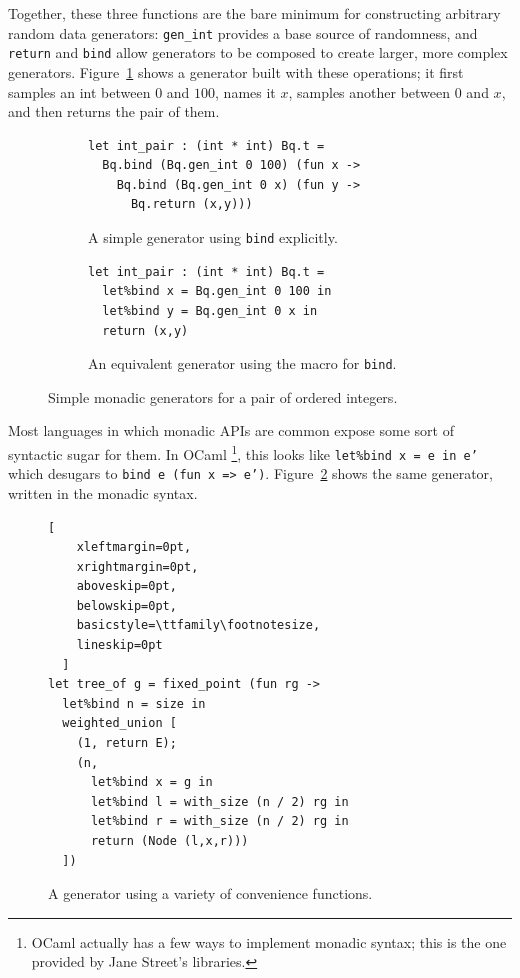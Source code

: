 \documentclass[acmsmall]{acmart}
\theoremstyle{definition}
\begin{document}
Together, these three functions are the bare minimum for constructing arbitrary
random data generators: \texttt{gen\_int} provides a base source of randomness,
and \texttt{return} and \texttt{bind} allow generators to be composed to create
larger, more complex generators. Figure~\ref{fig:simple-bind} shows a generator
built with these operations; it first samples an int between $0$ and $100$,
names it $x$, samples another between $0$ and $x$, and then returns the pair of
them.

\begin{figure}[h]
  \begin{subfigure}{.49\textwidth}
\begin{lstlisting}
let int_pair : (int * int) Bq.t =
  Bq.bind (Bq.gen_int 0 100) (fun x ->
    Bq.bind (Bq.gen_int 0 x) (fun y ->
      Bq.return (x,y)))
\end{lstlisting}
\caption{A simple generator using \texttt{bind} explicitly.}\label{fig:simple-bind}
  \end{subfigure}
  \begin{subfigure}{.49\textwidth}
\begin{lstlisting}
let int_pair : (int * int) Bq.t =
  let%bind x = Bq.gen_int 0 100 in
  let%bind y = Bq.gen_int 0 x in
  return (x,y)
\end{lstlisting}
\caption{An equivalent generator using the macro for \texttt{bind}.}\label{fig:simple-macro}
  \end{subfigure}
  \caption{Simple monadic generators for a pair of ordered integers.}\label{fig:simple-pair}
\end{figure}

Most languages in which monadic APIs are common expose some sort of syntactic
sugar for them. In OCaml \footnote{OCaml actually has a few ways to implement
monadic syntax; this is the one provided by Jane Street's libraries.}, this
looks like \texttt{let\%bind x = e in e'} which desugars to
\texttt{bind e (fun x => e')}. Figure~\ref{fig:simple-macro} shows the same
generator, written in the monadic syntax.

\begin{figure}
  \vspace{1.5em}
\begin{lstlisting}[
    xleftmargin=0pt,
    xrightmargin=0pt,
    aboveskip=0pt,
    belowskip=0pt,
    basicstyle=\ttfamily\footnotesize,
    lineskip=0pt
  ]
let tree_of g = fixed_point (fun rg ->
  let%bind n = size in
  weighted_union [
    (1, return E);
    (n,
      let%bind x = g in
      let%bind l = with_size (n / 2) rg in
      let%bind r = with_size (n / 2) rg in
      return (Node (l,x,r)))
  ])
\end{lstlisting}
\caption{A generator using a variety of convenience functions.}\label{fig:tree_of}
\end{figure}
\end{document}
